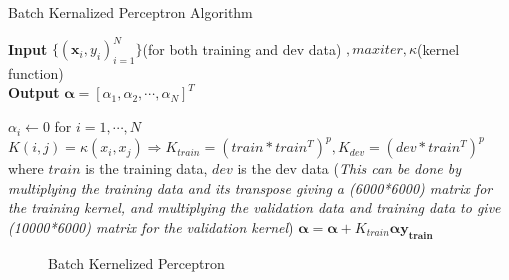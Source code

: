 \documentclass{article}
\begin{document}
\begin{algorithm}
\caption{Batch Kernalized Perceptron Algorithm}\label{alg:algo}
\hspace*{\algorithmicindent} \textbf{Input} $\{(\mathbf{x}_{i}, y_{i})_{i=1}^{N}\}$(for both training and dev data) $, maxiter, \kappa$(kernel function) \\
\hspace*{\algorithmicindent} \textbf{Output} $\boldsymbol\alpha = [ \alpha_{1}, \alpha_{2}, \cdots, \alpha_{N}]^{T}$ 
\begin{algorithmic}[1]
	\State $\alpha_{i} \leftarrow 0$ for $i = 1, \cdots, N$
		\State $K(i, j) = \kappa(x_{i}, x_{j}) \Rightarrow K_{train} = (train*train^{T})^{p}, K_{dev} = (dev*train^{T})^{p}$  where $train$ is the training data, $dev$ is the dev data 
		\State (\textit{This can be done by multiplying the training data and its transpose giving a (6000*6000) matrix for the training kernel, and multiplying the validation data and training data to give (10000*6000) matrix for the validation kernel})
	\EndFor
		\State $\boldsymbol\alpha = \boldsymbol\alpha + K_{train} \boldsymbol\alpha \mathbf{y_{train}}$
	\EndWhile
\end{algorithmic}
\end{algorithm}

\begin{figure}[H]
	\centering
    \caption{Batch Kernelized Perceptron}
    \label{fig:Batch_KP}%
\end{figure}
\end{document}
